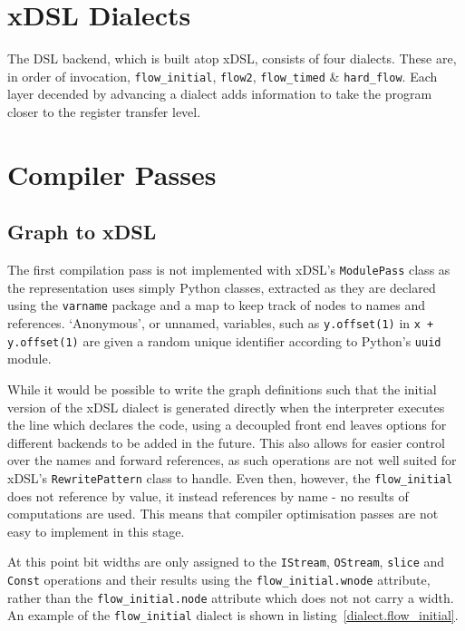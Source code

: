 \section{xDSL Dialects}
The DSL backend, which is built atop xDSL, consists of four dialects. These are, in order of invocation, \lstinline|flow_initial|, \lstinline|flow2|, \lstinline|flow_timed| \& \lstinline|hard_flow|. Each layer decended by advancing a dialect adds information to take the program closer to the register transfer level.

\section{Compiler Passes}
\subsection{Graph to xDSL}\label{graph.2.xdsl}
The first compilation pass is not implemented with xDSL's \lstinline|ModulePass| class as the representation uses simply Python classes, extracted as they are declared using the \lstinline|varname| package and a map to keep track of nodes to names and references. `Anonymous', or unnamed, variables, such as \lstinline|y.offset(1)| in \lstinline|x + y.offset(1)| are given a random unique identifier according to Python's \lstinline|uuid| module.

While it would be possible to write the graph definitions such that the initial version of the xDSL dialect is generated directly when the interpreter executes the line which declares the code, using a decoupled front end leaves options for different backends to be added in the future. This also allows for easier control over the names and forward references, as such operations are not well suited for xDSL's \lstinline|RewritePattern| class to handle. Even then, however, the \lstinline|flow_initial| does not reference by value, it instead references by name \hyphen{} no results of computations are used. This means that compiler optimisation passes are not easy to implement in this stage.

At this point bit widths are only assigned to the \lstinline|IStream|, \lstinline|OStream|, \lstinline|slice| and \lstinline|Const| operations and their results using the \lstinline|flow_initial.wnode| attribute, rather than the \lstinline|flow_initial.node| attribute which does not not carry a width. An example of the \lstinline|flow_initial| dialect is shown in listing \ref{dialect.flow_initial}.

